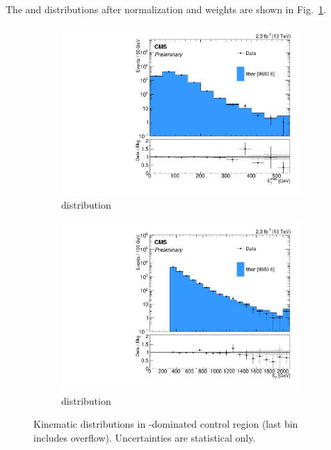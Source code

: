 The \MET and \ST distributions after normalization and weights are shown in Fig.~\ref{fig:tt/METST}.

\begin{figure}
\begin{center}
	\begin{subfigure}[b]{.7\textwidth}
		\includegraphics[width=\textwidth]{Background/bkg_tt/ttbar_MET_STgt300_afterWeights}
		\caption{\MET distribution}
	\end{subfigure}
	\begin{subfigure}[b]{.7\textwidth}
		\includegraphics[width=\textwidth]{Background/bkg_tt/ttbar_ST_STgt300_afterWeights}
		\caption{\ST distribution}
	\end{subfigure}
	\caption{Kinematic distributions in \ttbar-dominated control region (last bin includes overflow). Uncertainties are statistical only.
	\label{fig:tt/METST}}
\end{center}
\end{figure}

